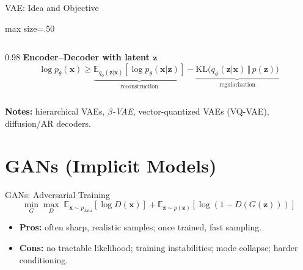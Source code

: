 \documentclass[aspectratio=169]{beamer}
\begin{document}
\begin{frame}{VAE: Idea and Objective}
\centering
\begin{adjustbox}{max size={\linewidth}{.50\textheight}}
\end{adjustbox}

\vspace{0.6em}
\begin{columns}[T]
  \begin{column}{0.98\linewidth}
    \textbf{Encoder--Decoder with latent $\mathbf{z}$}
    \begin{equation*}
      \log p_\theta(\mathbf{x}) \ge \underbrace{\mathbb{E}_{q_\phi(\mathbf{z}|\mathbf{x})}[\log p_\theta(\mathbf{x}|\mathbf{z})]}_{\text{reconstruction}} - \underbrace{\mathrm{KL}\big(q_\phi(\mathbf{z}|\mathbf{x})\,\Vert\,p(\mathbf{z})\big)}_{\text{regularization}}
    \end{equation*}
  \end{column}
\end{columns}
\vspace{0.3em}
\textbf{Notes:} hierarchical VAEs, \emph{\!\!$\beta$\!-VAE}, vector-quantized VAEs (VQ-VAE), diffusion/AR decoders.
\end{frame}

\section{GANs (Implicit Models)}

\begin{frame}{GANs: Adversarial Training}
\begin{equation*}
  \min_G \max_D \; \mathbb{E}_{\mathbf{x}\sim p_{\text{data}}}[\log D(\mathbf{x})] + \mathbb{E}_{\mathbf{z}\sim p(\mathbf{z})}[\log (1 - D(G(\mathbf{z})))]
\end{equation*}
\begin{itemize}
  \item \textbf{Pros:} often sharp, realistic samples; once trained, fast sampling.
  \item \textbf{Cons:} no tractable likelihood; training instabilities; mode collapse; harder conditioning.
\end{itemize}
\end{frame}
\end{document}
